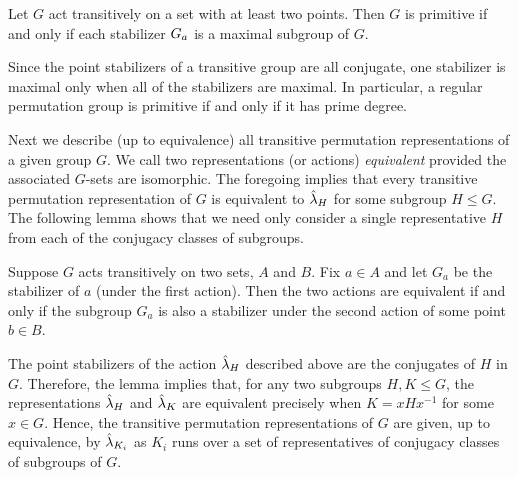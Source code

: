 \begin{corollary}
  Let $G$ act transitively on a set with at least two
  points. 
  Then $G$ is primitive if and only if each stabilizer $G_{a}$ is a
  maximal subgroup of $G$.
\end{corollary}

Since the point stabilizers of a transitive group are all conjugate, 
one stabilizer is maximal only when all of the stabilizers are maximal. 
In particular, a regular permutation group is primitive if and only if it has
prime degree. 

Next we describe (up to equivalence) all transitive permutation
representations of a given group $G$.  
We call two representations (or actions) 
%
\emph{equivalent}
provided the associated $G$-sets are isomorphic. 
The foregoing implies that every transitive permutation representation of $G$ is
equivalent to $\hat{\lambda}_H$ for some subgroup $H \leq G$.  The following
lemma
shows that we need only consider a single representative $H$ from each of the
conjugacy classes of subgroups.  

\begin{lemma}
  Suppose $G$ acts transitively on two sets,
  $A$ and $B$.  Fix $a\in A$ and let $G_a$ be the stabilizer of $a$ (under the first
  action).  Then the two actions are equivalent
  if and only if the subgroup $G_a$ is also a stabilizer under the second action
  of some point $b\in B$. 
\end{lemma}

The point stabilizers of the action $\hat{\lambda}_H$ described above are the
conjugates of $H$ in $G$.  Therefore, the lemma implies that, for any two
subgroups $H, K \leq G$, the representations $\hat{\lambda}_H$ and $\hat{\lambda}_K$ are
equivalent precisely when $K = x Hx^{-1}$ for some $x\in G$. 
Hence, the transitive permutation representations of $G$ are given, up to
equivalence, by $\hat{\lambda}_{K_i}$ as $K_i$ runs over a set of representatives of
conjugacy classes of subgroups of $G$.   



